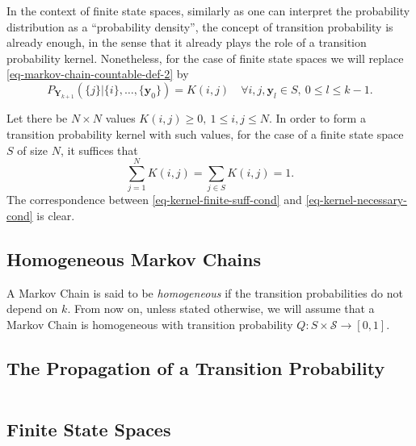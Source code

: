 In the context of finite state spaces, similarly as one can interpret the probability distribution as a ``probability density'',
the concept of transition probability is already enough, in the sense that it already plays the role of a transition probability kernel.
Nonetheless, for the case of finite state spaces we will replace \eqref{eq-markov-chain-countable-def-2} by
\begin{equation}\label{eq-markov-chain-finite-def-3}
P_{\mathbf{Y}_{k+1}}(
\{j\}
|
\{i\},
\ldots,
\{\mathbf{y}_0\}
)
=
K(i,j)
\quad\forall
i,j,\mathbf{y}_l\in S,~0\leqslant l\leqslant k-1.
\end{equation}

Let there be $N\times N$ values $K(i,j)\geqslant 0,~1\leqslant i,j\leqslant N$.
In order to form a transition probability kernel with such values, for the case of a finite state space $S$ of size $N$, it suffices that
\begin{equation}\label{eq-kernel-finite-suff-cond}
\sum_{j=1}^N K(i,j) = \sum_{j\in S}K(i,j) = 1.
\end{equation}
The correspondence between \eqref{eq-kernel-finite-suff-cond} and \eqref{eq-kernel-necessary-cond} is clear.

\subsection{Homogeneous Markov Chains}

A Markov Chain is said to be {\it homogeneous} if the transition probabilities do not depend on $k$.
From now on, unless stated otherwise,
we will assume that a Markov Chain is homogeneous with transition probability $Q:S\times\mathcal{S}\rightarrow [0,1]$.

\subsection{The Propagation of a Transition Probability}
$~$\\

\subsection{Finite State Spaces}


